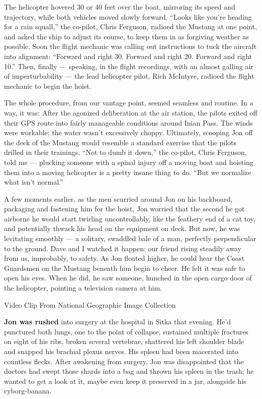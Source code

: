 The helicopter hovered 30 or 40 feet over the boat, mirroring its speed
and trajectory, while both vehicles moved slowly forward. ``Looks like
you're heading for a rain squall,'' the co-pilot, Chris Ferguson,
radioed the Mustang at one point, and asked the ship to adjust its
course, to keep them in as forgiving weather as possible. Soon the
flight mechanic was calling out instructions to tuck the aircraft into
alignment: ``Forward and right 30. Forward and right 20. Forward and
right 10.'' Then, finally --- speaking, in the flight recordings, with
an almost galling air of imperturbability --- the lead helicopter pilot,
Rich McIntyre, radioed the flight mechanic to begin the hoist.

The whole procedure, from our vantage point, seemed seamless and
routine. In a way, it was: After the agonized deliberation at the air
station, the pilots exited off their GPS route into fairly manageable
conditions around Inian Pass. The winds were workable; the water wasn't
excessively choppy. Ultimately, scooping Jon off the deck of the Mustang
would resemble a standard exercise that the pilots drilled in their
trainings. ``Not to dumb it down,'' the co-pilot, Chris Ferguson, told
me --- plucking someone with a spinal injury off a moving boat and
hoisting them into a moving helicopter is a pretty insane thing to do.
``But we normalize what isn't normal.''

A few moments earlier, as the men scurried around Jon on his backboard,
packaging and fastening him for the hoist, Jon worried that the second
he got airborne he would start twirling uncontrollably, like the
feathery end of a cat toy, and potentially thwack his head on the
equipment on deck. But now, he was levitating smoothly --- a solitary,
swaddled bale of a man, perfectly perpendicular to the ground. Dave and
I watched it happen: our friend rising steadily away from us,
improbably, to safety. As Jon floated higher, he could hear the Coast
Guardsmen on the Mustang beneath him begin to cheer. He felt it was safe
to open his eyes. When he did, he saw someone, hunched in the open cargo
door of the helicopter, pointing a television camera at him.

 Video Clip From National Geographic Image Collection

\textbf{Jon was rushed} into surgery at the hospital in Sitka that
evening. He'd punctured both lungs, one to the point of collapse,
sustained multiple fractures on eight of his ribs, broken several
vertebrae, shattered his left shoulder blade and snapped his brachial
plexus nerves. His spleen had been macerated into countless flecks.
After awakening from surgery, Jon was disappointed that the doctors had
swept those shards into a bag and thrown his spleen in the trash; he
wanted to get a look at it, maybe even keep it preserved in a jar,
alongside his cyborg-banana.

